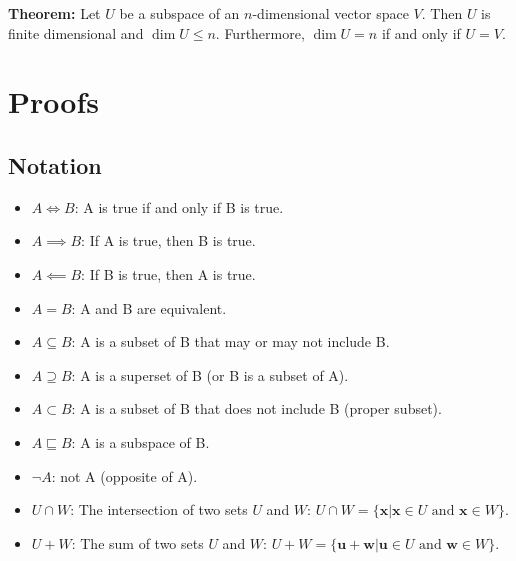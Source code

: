 \documentclass{article}
\newcommand{\bff}[1]{\mathbf{#1}}
\begin{document}
\begin{minipage}[t]{.45\textwidth}
        \textbf{Theorem:} Let $U$ be a subspace of an $n$-dimensional vector space $V$. Then $U$ is finite dimensional and $\dim U \le n$. Furthermore, $\dim U = n$ if and only if $U = V$.
    \end{minipage}
    \newpage
    \section{Proofs}
    \subsection{Notation}
    \begin{itemize}
        \item $A \iff B$: A is true if and only if B is true.
        \item $A \implies B$: If A is true, then B is true.
        \item $A \impliedby B$: If B is true, then A is true.
        \item $A = B$: A and B are equivalent.
        \item $A \subseteq B$: A is a subset of B that may or may not include B.
        \item $A \supseteq B$: A is a superset of B (or B is a subset of A).
        \item $A \subset B$: A is a subset of B that does not include B (proper subset).
        \item $A \sqsubseteq B$: A is a subspace of B.
        \item $\neg A$: not A (opposite of A).
        \item $U \cap W$: The intersection of two sets $U$ and $W$: $U \cap W = \{\bff{x} | \bff{x} \in U \text{ and } \bff{x} \in W\}$.
        \item $U + W$: The sum of two sets $U$ and $W$: $U + W = \{\bff{u}+\bff{w} | \bff{u} \in U \text{ and } \bff{w} \in W\}$.

    \end{itemize}
\end{document}
